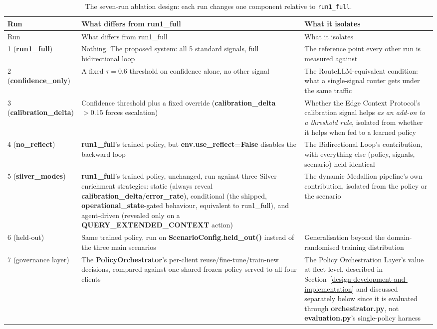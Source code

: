 {\small\setlength{\tabcolsep}{4pt}
\begin{longtable}{p{1.7cm}p{4.0cm}p{6.3cm}} \caption{The seven-run
ablation design: each run changes one component relative to
\texttt{run1\_full}.}\label{tab:ablation-design}\\ \toprule Run & What
differs from run1\_full & What it isolates \\ \midrule \endfirsthead
\toprule Run & What
differs from run1\_full & What it isolates \\ \midrule \endhead 1
(\textbf{run1\_full}) & Nothing. The proposed system: all 5 standard
signals, full bidirectional loop & The reference point every other run
is measured against \\ 2 (\textbf{confidence\_\-only}) & A fixed
$\tau=0.6$ threshold on confidence alone, no other signal & The
RouteLLM-equivalent condition: what a single-signal router gets under
the same traffic \\ 3 (\textbf{calibration\_\-delta}) &
Confidence threshold plus a fixed override (\textbf{calibration\_delta}
$>0.15$ forces escalation) & Whether the Edge Context Protocol's
calibration signal helps \emph{as an add-on to a threshold rule},
isolated from whether it helps when fed to a learned policy  \\ 4 (\textbf{no\_\-reflect}) &
\textbf{run1\_full}'s trained policy, but
\textbf{env.use\_reflect=False} disables the backward loop & The
Bidirectional Loop's contribution, with everything else (policy,
signals, scenario) held identical \\ 5 (\textbf{silver\_\-modes}) &
\textbf{run1\_full}'s trained policy, unchanged, run against three
Silver enrichment strategies: static (always reveal
\textbf{calibration\_delta}/\textbf{error\_rate}), conditional (the
shipped, \textbf{operational\_state}-gated behaviour, equivalent to
run1\_full), and agent-driven (revealed only on a
\textbf{QUERY\_EXTENDED\_CONTEXT} action) & The dynamic Medallion
pipeline's own contribution, isolated from the policy or the scenario \\
6 (held-out) & Same trained policy, run on
\textbf{ScenarioConfig.held\_out()} instead of the three main scenarios
& Generalisation beyond the domain-randomised training distribution \\ 7
(governance layer) & The \textbf{PolicyOrchestrator}'s per-client
reuse/fine-tune/train-new decisions, compared against one shared frozen
policy served to all four clients & The Policy Orchestration Layer's
value at fleet level, described in Section~\ref{design-development-and-implementation} and discussed separately
below since it is evaluated through \textbf{orchestrator.py}, not
\textbf{evaluation.py}'s single-policy harness \\ \bottomrule
\end{longtable} }

